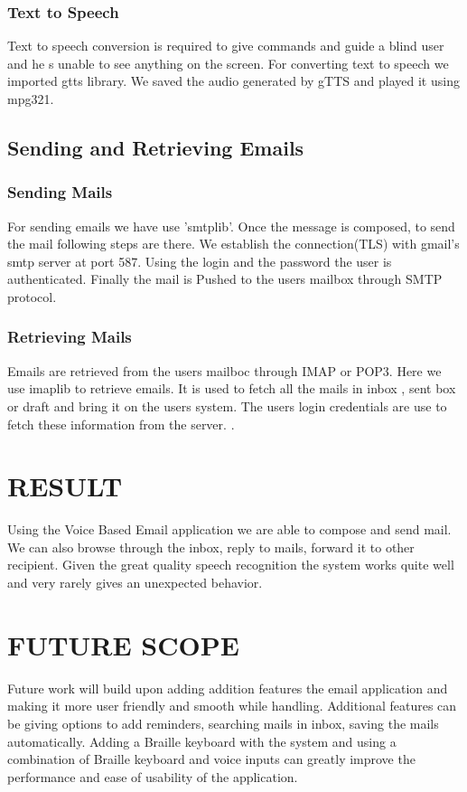 \documentclass[12pt]{article}
\begin{document}
\subsubsection{Text to Speech}
Text to speech conversion is required to give commands and guide a blind user and he s unable to see anything on the screen. For converting text to speech we imported gtts library.
We saved the audio generated by gTTS and played it using mpg321.

\subsection{Sending and Retrieving Emails}
\subsubsection{Sending Mails}
For sending emails we have use 'smtplib'. Once the message is composed, to send the mail following steps are there. We establish the connection(TLS) with gmail's smtp server at port 587. Using the login and the password the user is authenticated. Finally the mail is Pushed to the users mailbox through SMTP protocol.
\subsubsection{Retrieving Mails}
Emails are retrieved from the users mailboc through IMAP or POP3. Here we use imaplib to retrieve emails. It is used to fetch all the mails in inbox , sent box or draft and bring it on the users system. The users login credentials are use to fetch these information from the server.  
.\newline

\section{RESULT}
Using the Voice Based Email application we are able to compose and send mail. We can also browse through the inbox, reply to mails, forward it to other recipient. Given the great quality speech recognition the system works quite well and very rarely gives an unexpected behavior.

\section{FUTURE SCOPE}
Future work will build upon adding addition features the email application and making it more user friendly and smooth while handling. Additional features can be giving options to add reminders, searching mails in inbox, saving the mails automatically. Adding a Braille keyboard with the system and using a combination of Braille keyboard and voice inputs can greatly improve the performance and ease of usability of the application. 
\end{document}
